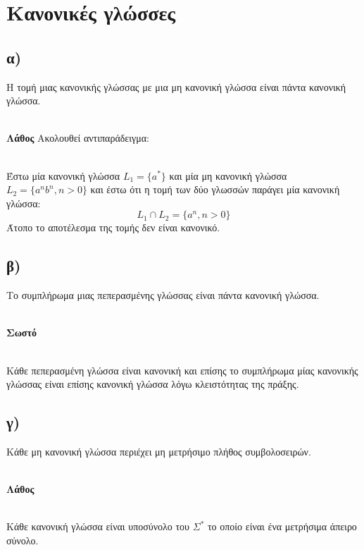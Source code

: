 \section{Κανονικές γλώσσες}
\subsection[Ερώτημα α]{\textbf{α) }} Η τομή μιας κανονικής γλώσσας με μια μη κανονική γλώσσα είναι πάντα κανονική γλώσσα.

\noindent\\
\textbf{Λάθος} Ακολουθεί αντιπαράδειγμα:

\noindent\\
Έστω μία κανονική γλώσσα $L_1 = \{a^*\}$ και μία μη κανονική γλώσσα $L_2 = \{a^n b^n, n > 0\}$ και έστω ότι η τομή των δύο γλωσσών παράγει μία κανονική γλώσσα:
\begin{equation*}
	L_1 \cap L_2 = \{a^n, n>0\}
\end{equation*}
Άτοπο το αποτέλεσμα της τομής δεν είναι κανονικό.\\

\subsection[Ερώτημα β]{\textbf{β) }} Το συμπλήρωμα μιας πεπερασμένης γλώσσας είναι πάντα κανονική γλώσσα.

\noindent\\
\textbf{Σωστό}

\noindent\\
Κάθε πεπερασμένη γλώσσα είναι κανονική και επίσης το συμπλήρωμα μίας κανονικής γλώσσας είναι επίσης κανονική γλώσσα λόγω κλειστότητας της πράξης.\\

\subsection[Ερώτημα γ]{\textbf{γ) }} Κάθε μη κανονική γλώσσα περιέχει μη μετρήσιμο πλήθος συμβολοσειρών.

\noindent\\
\textbf{Λάθος}

\noindent\\
Κάθε κανονική γλώσσα είναι υποσύνολο του $\Sigma^*$ το οποίο είναι ένα μετρήσιμα άπειρο σύνολο. 

